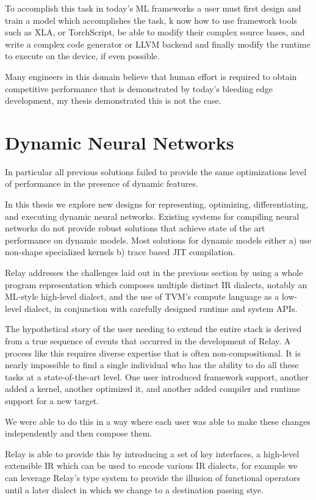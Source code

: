 To accomplish this task in today’s ML frameworks a user must first design and train a model which accomplishes the task, k
now how to use framework tools such as XLA, or TorchScript, be able to modify their complex source bases, and write a complex code generator
or LLVM backend and finally modify the runtime to execute on the device, if even possible.

Many engineers in this domain believe that human effort is required to obtain competitive performance that is demonstrated by today’s bleeding edge development,
my thesis demonstrated this is not the case.

\section{Dynamic Neural Networks}

In particular all previous solutions failed to provide the same optimizations
  level of performance in the presence of dynamic features.

In this thesis we explore new designs for representing,
  optimizing, differentiating, and executing dynamic neural networks.
Existing systems for compiling neural networks do not provide robust
   solutions that achieve state of the art performance on dynamic models.
Most solutions for dynamic models either
  a) use non-shape specialized kernels b) trace based JIT compilation.

Relay addresses the challenges laid out in the previous section by using
  a whole program representation which composes multiple distinct IR dialects,
  notably an ML-style high-level dialect,
  and the use of TVM’s compute language as a low-level dialect,
  in conjunction with carefully designed runtime and system APIs.

The hypothetical story of the user needing to extend the entire stack is derived
  from a true sequence of events that occurred in the development of Relay.
A process like this requires diverse expertise that is often non-compositional. It is nearly impossible to find a single individual who has the ability
  to do all these tasks at a state-of-the-art level.
One user introduced framework support, another added a kernel, another optimized it, and another added compiler and runtime support for a new target.

We were able to do this in a way where each user was able to make these changes independently and then compose them.

Relay is able to provide this by introducing a set of key interfaces, a high-level extensible IR which can be used to encode various IR dialects,
  for example we can leverage Relay’s type system to provide the illusion of functional operators until a later dialect in which we change
  to a destination passing stye.

